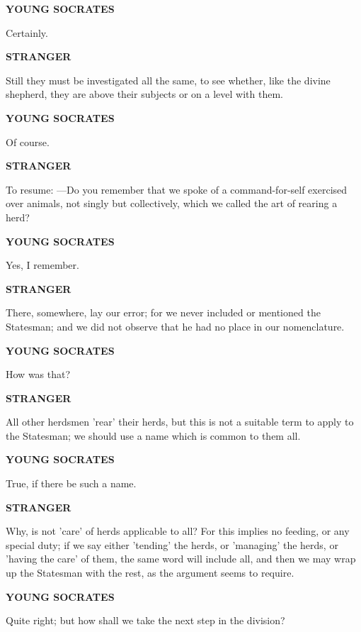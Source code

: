 \documentclass[11pt,letter]{article}
\begin{document}
\par \textbf{YOUNG SOCRATES}
\par   Certainly.

\par \textbf{STRANGER}
\par   Still they must be investigated all the same, to see whether, like the divine shepherd, they are above their subjects or on a level with them.

\par \textbf{YOUNG SOCRATES}
\par   Of course.

\par \textbf{STRANGER}
\par   To resume: —Do you remember that we spoke of a command-for-self exercised over animals, not singly but collectively, which we called the art of rearing a herd?

\par \textbf{YOUNG SOCRATES}
\par   Yes, I remember.

\par \textbf{STRANGER}
\par   There, somewhere, lay our error; for we never included or mentioned the Statesman; and we did not observe that he had no place in our nomenclature.

\par \textbf{YOUNG SOCRATES}
\par   How was that?

\par \textbf{STRANGER}
\par   All other herdsmen 'rear' their herds, but this is not a suitable term to apply to the Statesman; we should use a name which is common to them all.

\par \textbf{YOUNG SOCRATES}
\par   True, if there be such a name.

\par \textbf{STRANGER}
\par   Why, is not 'care' of herds applicable to all? For this implies no feeding, or any special duty; if we say either 'tending' the herds, or 'managing' the herds, or 'having the care' of them, the same word will include all, and then we may wrap up the Statesman with the rest, as the argument seems to require.

\par \textbf{YOUNG SOCRATES}
\par   Quite right; but how shall we take the next step in the division?
\end{document}

